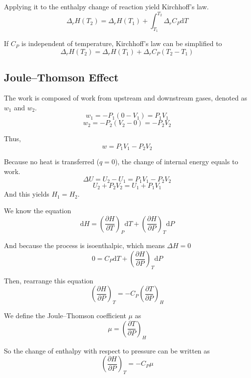 \documentclass[letterpaper]{article}
\newcommand{\diff}{\mathrm{d}}
\begin{document}
Applying it to the enthalpy change of reaction yield Kirchhoff’s law.
\begin{equation*}
    \Delta_rH(T_2)=\Delta_rH(T_1)+\int_{T_1}^{T_2}\Delta_rC_P\diff T
\end{equation*}

If $C_P$ is independent of temperature, Kirchhoff’s law can be simplified to
\begin{equation*}
    \Delta_rH(T_2)=\Delta_rH(T_1)+\Delta_rC_P(T_2-T_1)
\end{equation*}
\subsection*{Joule–Thomson Effect}
The work is composed of work from upstream and downstream gases, denoted as $w_1$ and $w_2$.
\begin{equation*}
    w_1=-P_1(0-V_1)=P_1V_1
\end{equation*}
\begin{equation*}
    w_2=-P_2(V_2-0)=-P_2V_2
\end{equation*}

Thus,
\begin{equation*}
    w=P_1V_1-P_2V_2
\end{equation*}

Because no heat is transferred ($q=0$), the change of internal energy equals to work.
\begin{equation*}
    \Delta U=U_2-U_1=P_1V_1-P_2V_2
\end{equation*}
\begin{equation*}
    U_2+P_2V_2=U_1+P_1V_1
\end{equation*}
And this yields $H_1=H_2$.

We know the equation
\begin{equation*}
    \diff H=\left(\frac{\partial H}{\partial T}\right)_P\diff T+\left(\frac{\partial H}{\partial P}\right)_T\diff P
\end{equation*}

And because the process is isoenthalpic, which means $\Delta H=0$
\begin{equation*}
    0=C_P\diff T+\left(\frac{\partial H}{\partial P}\right)_T\diff P
\end{equation*}

Then, rearrange this equation
\begin{equation*}
    \left(\frac{\partial H}{\partial P}\right)_T=-C_P\left(\frac{\partial T}{\partial P}\right)_H
\end{equation*}

We define the Joule–Thomson coefficient $\mu$ as
\begin{equation*}
    \mu=\left(\frac{\partial T}{\partial P}\right)_H
\end{equation*}

So the change of enthalpy with respect to pressure can be written as
\begin{equation*}
    \boxed{\left(\frac{\partial H}{\partial P}\right)_T=-C_P\mu}
\end{equation*}
\end{document}
